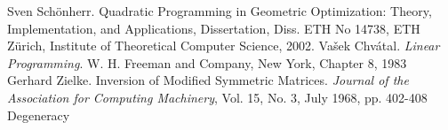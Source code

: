 \documentclass[a4paper]{article}
\begin{document}


\begin{thebibliography}{99}
 Sven Sch\"{o}nherr. Quadratic Programming in Geometric Optimization:
Theory, Implementation, and Applications, Dissertation, Diss. ETH No 14738, ETH
Z\"{u}rich, Institute of Theoretical Computer Science, 2002.
 Va\v{s}ek Chv\'{a}tal. \textit{Linear Programming}. W. H. Freeman and Company,
New York, Chapter 8, 1983 
 Gerhard Zielke. Inversion of Modified Symmetric Matrices. 
\textit{Journal of the Association for Computing Machinery}, Vol. 15, No. 3,
July 1968, pp. 402-408
 Degeneracy
\end{thebibliography}
\end{document}
